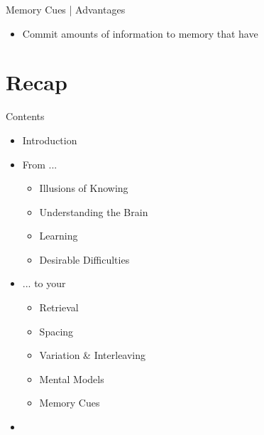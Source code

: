 \documentclass{ercisbeamer}
\begin{document}
\begin{frame}{Memory Cues | Advantages}
    \begin{itemize}
        \item Commit  amounts of information to memory that have 
    \end{itemize}
\end{frame}

\section{Recap}
\begin{frame}{Contents}
    \begin{itemize}
        \item Introduction
        \item From ...
        \begin{itemize}
            \item Illusions of Knowing
            \item Understanding the Brain
            \item Learning
            \item Desirable Difficulties
        \end{itemize}
        \item ... to your 
        \begin{itemize}
            \item Retrieval
            \item Spacing
            \item Variation \& Interleaving
            \item Mental Models
            \item Memory Cues
        \end{itemize}
        \item {}
    \end{itemize}
\end{frame}
\end{document}
